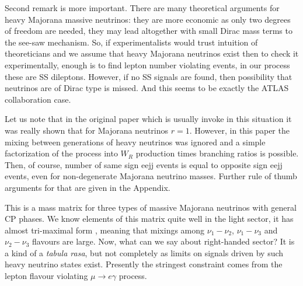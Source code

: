 \documentclass[twocolumn,superscriptaddress,showpacs,prl,nofootinbib,floatfix]{revtex4}
\begin{document}
Second remark is more important.  There are many theoretical arguments for heavy Majorana massive neutrinos: they are more economic as only two degrees of freedom are needed, they may lead altogether with small Dirac mass terms to the see-saw mechanism. So, if experimentalists would trust intuition of theoreticians and we assume that heavy Majorana neutrinos exist then to check it experimentally, enough is to find lepton number violating events, in our process these are SS dileptons. However, if no SS signals are found, then possibility that neutrinos are of Dirac type is missed. And this seems to be exactly the ATLAS collaboration case.


Let us note that in the original paper \cite{Keung:1983uu} which is usually invoke in this situation it was really shown that for Majorana neutrinos $r=1$. However, in this paper the mixing between generations of heavy neutrinos was ignored and a simple factorization of the process into $W_R$ production times branching ratios is possible. Then, of course, number of same sign eejj events is equal to opposite sign eejj events, even for non-degenerate Majorana neutrino masses. Further rule of thumb arguments  for that are given in the Appendix. 
 
This is a mass matrix for three types of massive Majorana neutrinos with general CP phases.
We know elements of this matrix quite well in the light sector, it has almost tri-maximal form , meaning that mixings among $\nu_1-\nu_2$, $\nu_1-\nu_3$ and $\nu_2-\nu_3$ flavours are large. Now, what can we say about right-handed sector? It is a kind of a {\it tabula rasa}, but not completely as limits on signals driven by such heavy neutrino states exist. Presently the stringest constraint comes from the lepton flavour violating $\mu \to e \gamma$ process.	
\end{document}
